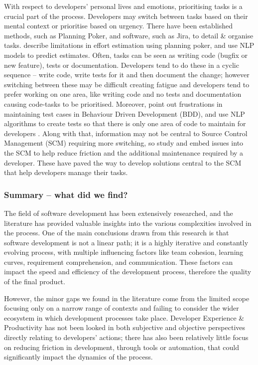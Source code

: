 \documentclass[../mpaper.tex]{subfiles}
\begin{document}
With respect to developers' personal lives and emotions, prioritising tasks is a crucial part of the process. Developers may switch between tasks based on their mental context or prioritise based on urgency. There have been established methods, such as Planning Poker, and software, such as Jira, to detail \& organise tasks. \citet{alhamedEvaluationContextAwareLanguage2022} describe limitations in effort estimation using planning poker, and use NLP models to predict estimates. Often, tasks can be seen as writing code (bugfix or new feature), tests or documentation. Developers tend to do these in a cyclic sequence -- write code, write tests for it and then document the change; however switching between these may be difficult creating fatigue and developers tend to prefer working on one area, like writing code and no tests and documentation causing code-tasks to be prioritised. Moreover, \citet{storerBehaveNicelyAutomatic2019} point out frustrations in maintaining test cases in Behaviour Driven Development (BDD), and use NLP algorithms to create tests so that there is only one area of code to maintain for developers \cite{binamunguMaintainingBehaviourDriven2018}. Along with that, information may not be central to Source Control Management (SCM) requiring more switching, so \citet{edwardsSciitEmbeddingIssue2021} study and embed issues into the SCM to help reduce friction and the additional maintenance required by a developer. These have paved the way to develop solutions central to the SCM that help developers manage their tasks.

\subsubsection*{Summary -- what did we find?}

The field of software development has been extensively researched, and the literature has provided valuable insights into the various complexities involved in the process. One of the main conclusions drawn from this research is that software development is not a linear path; it is a highly iterative and constantly evolving process, with multiple influencing factors like team cohesion, learning curves, requirement comprehension, and communication. These factors can impact the speed and efficiency of the development process, therefore the quality of the final product.

However, the minor gaps we found in the literature come from the limited scope focusing only on a narrow range of contexts and failing to consider the wider ecosystem in which development processes take place. Developer Experience \& Productivity has not been looked in both subjective and objective perspectives directly relating to developers' actions; there has also been relatively little focus on reducing friction in development, through tools or automation, that could significantly impact the dynamics of the process.
\end{document}
